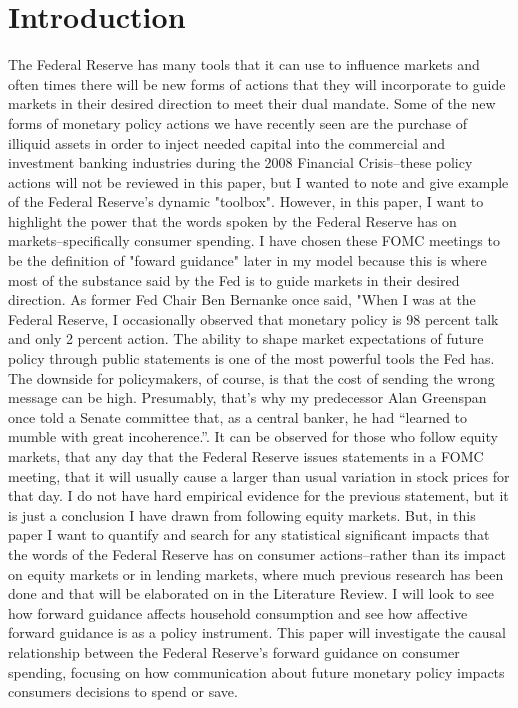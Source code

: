 \documentclass[12pt,english]{article}
\begin{document}
\section{Introduction}\label{sec:intro}
 The Federal Reserve has many tools that it can use to influence markets and often times there will be new forms of actions that they will incorporate to guide markets in their desired direction to meet their dual mandate. Some of the new forms of monetary policy actions we have recently seen are the purchase of illiquid assets in order to inject needed capital into the commercial and investment banking industries during the 2008 Financial Crisis--these policy actions will not be reviewed in this paper, but I wanted to note and give example of the Federal Reserve's dynamic "toolbox". However, in this paper, I want to highlight the power that the words spoken by the Federal Reserve has on markets--specifically consumer spending. I have chosen these FOMC meetings to be the definition of "foward guidance" later in my model because this is where most of the substance said by the Fed is to guide markets in their desired direction. As former Fed Chair Ben Bernanke once said, "When I was at the Federal Reserve, I occasionally observed that monetary policy is 98 percent talk and only 2 percent action. The ability to shape market expectations of future policy through public statements is one of the most powerful tools the Fed has. The downside for policymakers, of course, is that the cost of sending the wrong message can be high. Presumably, that’s why my predecessor Alan Greenspan once told a Senate committee that, as a central banker, he had “learned to mumble with great incoherence.”\citet{Bernanke2015}. It can be observed for those who follow equity markets, that any day that the Federal Reserve issues statements in a FOMC meeting, that it will usually cause a larger than usual variation in stock prices for that day. I do not have hard empirical evidence for the previous statement, but it is just a conclusion I have drawn from following equity markets. But, in this paper I want to quantify and search for any statistical significant impacts that the words of the Federal Reserve has on consumer actions--rather than its impact on equity markets or in lending markets, where much previous research has been done and that will be elaborated on in the Literature Review. I will look to see how forward guidance affects household consumption and see how affective forward guidance is as a policy instrument. This paper will investigate the causal relationship between the Federal Reserve’s forward guidance on consumer spending, focusing on how communication about future monetary policy impacts consumers decisions to spend or save.
\end{document}
